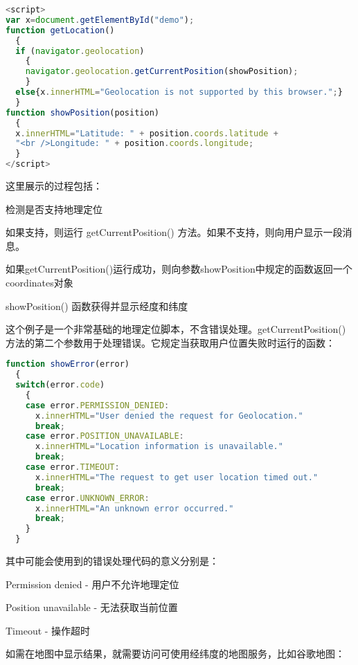\begin{lstlisting}[language=JavaScript]
<script>
var x=document.getElementById("demo");
function getLocation()
  {
  if (navigator.geolocation)
    {
    navigator.geolocation.getCurrentPosition(showPosition);
    }
  else{x.innerHTML="Geolocation is not supported by this browser.";}
  }
function showPosition(position)
  {
  x.innerHTML="Latitude: " + position.coords.latitude +
  "<br />Longitude: " + position.coords.longitude;
  }
</script>
\end{lstlisting}


这里展示的过程包括：

\begin{compactenum}
\item 检测是否支持地理定位
\item 如果支持，则运行 getCurrentPosition() 方法。如果不支持，则向用户显示一段消息。
\item 如果getCurrentPosition()运行成功，则向参数showPosition中规定的函数返回一个coordinates对象
\item showPosition() 函数获得并显示经度和纬度
\end{compactenum}




这个例子是一个非常基础的地理定位脚本，不含错误处理。getCurrentPosition() 方法的第二个参数用于处理错误。它规定当获取用户位置失败时运行的函数：


\begin{lstlisting}[language=JavaScript]
function showError(error)
  {
  switch(error.code)
    {
    case error.PERMISSION_DENIED:
      x.innerHTML="User denied the request for Geolocation."
      break;
    case error.POSITION_UNAVAILABLE:
      x.innerHTML="Location information is unavailable."
      break;
    case error.TIMEOUT:
      x.innerHTML="The request to get user location timed out."
      break;
    case error.UNKNOWN_ERROR:
      x.innerHTML="An unknown error occurred."
      break;
    }
  }
\end{lstlisting}

其中可能会使用到的错误处理代码的意义分别是：

\begin{compactenum}
\item Permission denied - 用户不允许地理定位
\item Position unavailable - 无法获取当前位置
\item Timeout - 操作超时
\end{compactenum}

如需在地图中显示结果，就需要访问可使用经纬度的地图服务，比如谷歌地图：

